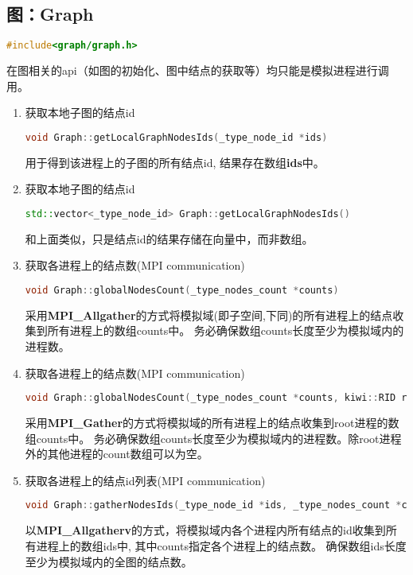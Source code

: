 \subsection{图：Graph}
\begin{lstlisting}[language=c]
#include<graph/graph.h>
\end{lstlisting}

在图相关的api（如图的初始化、图中结点的获取等）均只能是模拟进程进行调用。

\begin{enumerate}
  \item 获取本地子图的结点id
\begin{lstlisting}[language=c++]
  void Graph::getLocalGraphNodesIds(_type_node_id *ids)
\end{lstlisting}

  用于得到该进程上的子图的所有结点id, 结果存在数组\textbf{ids}中。

  \item 获取本地子图的结点id
\begin{lstlisting}[language=c++]
  std::vector<_type_node_id> Graph::getLocalGraphNodesIds()
\end{lstlisting}
  和上面类似，只是结点id的结果存储在向量中，而非数组。

  \item 获取各进程上的结点数(MPI communication)
\begin{lstlisting}[language=c++]
  void Graph::globalNodesCount(_type_nodes_count *counts)
\end{lstlisting}

  采用\textbf{MPI\_Allgather}的方式将模拟域(即子空间,下同)的所有进程上的结点收集到所有进程上的数组counts中。
  务必确保数组counts长度至少为模拟域内的进程数。

 \item 获取各进程上的结点数(MPI communication)
\begin{lstlisting}[language=c++]
  void Graph::globalNodesCount(_type_nodes_count *counts, kiwi::RID root)
\end{lstlisting}

  采用\textbf{MPI\_Gather}的方式将模拟域的所有进程上的结点收集到root进程的数组counts中。
    务必确保数组counts长度至少为模拟域内的进程数。除root进程外的其他进程的count数组可以为空。

 \item 获取各进程上的结点id列表(MPI communication)
\begin{lstlisting}[language=c++]
  void Graph::gatherNodesIds(_type_node_id *ids, _type_nodes_count *counts)
\end{lstlisting}
  以\textbf{MPI\_Allgatherv}的方式，将模拟域内各个进程内所有结点的id收集到所有进程上的数组ids中,
  其中counts指定各个进程上的结点数。 确保数组ids长度至少为模拟域内的全图的结点数。


\end{enumerate}
